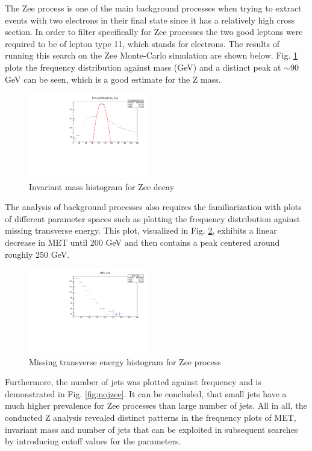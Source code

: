 \documentclass[runningheads,a4paper]{llncs}
\begin{document}
The Zee process is one of the main background processes when trying to extract events with two electrons in their final state since it has a relatively high cross section. In order to filter specifically for Zee processes the two good leptons were required to be of lepton type 11, which stands for electrons. The results of running this search on the Zee Monte-Carlo simulation are shown below. Fig. \ref{fig:invmzee} plots the frequency distribution against mass (GeV) and a distinct peak at $\sim$90 GeV can be seen, which is a good estimate for the Z mass.

\begin{figure}
\centering
\includegraphics[height=3.7cm]{InvM_Zee_fit}
\caption{Invariant mass histogram for Zee decay}
\label{fig:invmzee}
\end{figure}

The analysis of background processes also requires the familiarization with plots of different parameter spaces such as plotting the frequency distribution against missing transverse energy. This plot, visualized in Fig. \ref{fig:mtezee}, exhibits a linear decrease in MET until 200 GeV and then contains a peak centered around roughly 250 GeV.

\begin{figure}
\centering
\includegraphics[height=3.7cm]{MTE_Zee+new}
\caption{Missing transverse energy histogram for Zee process}
\label{fig:mtezee}
\end{figure}

Furthermore, the number of jets was plotted against frequency and is demonstrated in Fig. \ref{fig:nojzee}. It can be concluded, that small jets have a much higher prevalence for Zee processes than large number of jets. All in all, the conducted Z analysis revealed distinct patterns in the frequency plots of MET, invariant mass and number of jets that can be exploited in subsequent searches by introducing cutoff values for the parameters.
\end{document}
